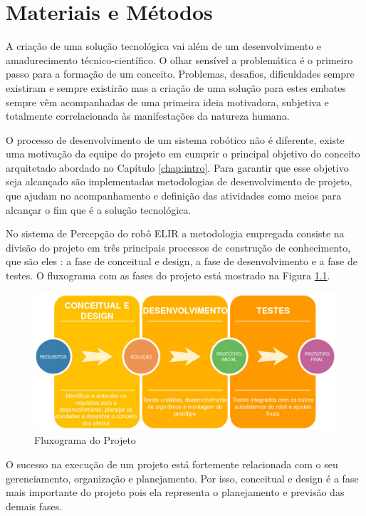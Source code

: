 \chapter{Materiais e Métodos}
\label{chap:mat}
A criação de uma solução tecnológica vai além de um desenvolvimento e amadurecimento técnico-científico. O olhar sensível a problemática é o primeiro passo para a formação de um conceito. Problemas, desafios, dificuldades sempre existiram e sempre existirão mas a criação de uma solução para estes embates sempre vêm acompanhadas de uma primeira ideia motivadora, subjetiva e totalmente correlacionada às manifestações da natureza humana.

O processo de desenvolvimento de um sistema robótico não é diferente, existe uma motivação da equipe do projeto em cumprir o principal objetivo do conceito arquitetado abordado no Capítulo \ref{chap:intro}. Para garantir que esse objetivo seja alcançado são implementadas metodologias de desenvolvimento de projeto, que ajudam no acompanhamento e definição das atividades como meios para alcançar o fim que é a solução tecnológica.

No sistema de Percepção do robô ELIR a metodologia empregada consiste na divisão do projeto em três principais processos de construção de conhecimento, que são eles : a fase de conceitual e design, a fase de desenvolvimento e a fase de testes. O fluxograma com as fases do projeto está mostrado na Figura \ref{Fig:flux_proj}.

\begin{figure}[h]
	\centering
	\includegraphics[width=16cm]{Figures/diagrama_proj.jpg}
	\caption{Fluxograma do Projeto}
	\label{Fig:flux_proj}
\end{figure}

O sucesso na execução de um projeto está fortemente relacionada com o seu gerenciamento, organização e planejamento. Por isso, conceitual e design é a fase mais importante do projeto pois ela representa o planejamento e previsão das demais fases. 


